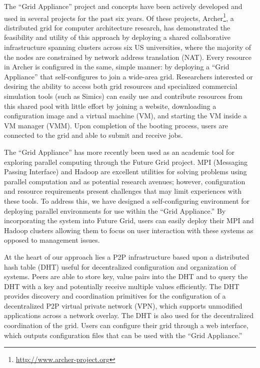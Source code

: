\documentclass[twocolumn]{svjour3}
\begin{document}
The ``Grid Appliance'' project and concepts have been actively developed and
used in several projects for the past six years.  Of these projects,
Archer\footnote{\url{http://www.archer-project.org}}, a distributed grid for
computer architecture research, has demonstrated the feasibility and utility of
this approach by deploying a shared collaborative infrastructure spanning
clusters across six US universities, where the majority of the nodes are
constrained by network address translation (NAT).  Every resource in Archer is
configured in the same, simple manner:  by deploying a ``Grid Appliance'' that
self-configures to join a wide-area grid.  Researchers interested or desiring
the ability to access both grid resources and specialized commercial simulation
tools (such as Simics) can easily use and contribute resources from this shared
pool with little effort by joining a website, downloading a configuration image
and a virtual machine (VM), and starting the VM inside a VM manager (VMM).
Upon completion of the booting process, users are connected to the grid and
able to submit and receive jobs.

The ``Grid Appliance'' has more recently been used as an academic tool for
exploring parallel computing through the Future Grid project.  MPI (Messaging
Passing Interface) and Hadoop are excellent utilities for solving problems
using parallel computation and as potential research avenues; however,
configuration and resource requirements present challenges that may limit
experiences with these tools.  To address this, we have designed a
self-configuring environment for deploying parallel environments for use within
the ``Grid Appliance.'' By incorporating the system into Future Grid, users can
easily deploy their MPI and Hadoop clusters allowing them to focus on user
interaction with these systems as opposed to management issues.

At the heart of our approach lies a P2P infrastructure based upon a distributed
hash table (DHT) useful for decentralized configuration and organization of
systems.  Peers are able to store key, value pairs into the DHT and to query
the DHT with a key and potentially receive multiple values efficiently.  The
DHT provides discovery and coordination primitives for the configuration of a
decentralized P2P virtual private network (VPN), which supports unmodified
applications across a network overlay.  The DHT is also used for the
decentralized coordination of the grid.  Users can configure their grid through
a web interface, which outputs configuration files that can be used with the
``Grid Appliance.''
\end{document}
